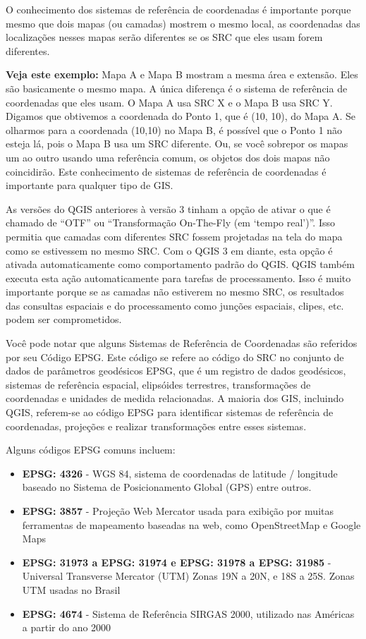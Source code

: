 \documentclass[
]{krantz}
\providecommand{\tightlist}{%
  \setlength{\itemsep}{0pt}\setlength{\parskip}{0pt}}
\begin{document}
O conhecimento dos sistemas de referência de coordenadas é importante porque mesmo que dois mapas (ou camadas) mostrem o mesmo local, as coordenadas das localizações nesses mapas serão diferentes se os SRC que eles usam forem diferentes.

\textbf{Veja este exemplo:} Mapa A e Mapa B mostram a mesma área e extensão. Eles são basicamente o mesmo mapa. A única diferença é o sistema de referência de coordenadas que eles usam. O Mapa A usa SRC X e o Mapa B usa SRC Y. Digamos que obtivemos a coordenada do Ponto 1, que é (10, 10), do Mapa A. Se olharmos para a coordenada (10,10) no Mapa B, é possível que o Ponto 1 não esteja lá, pois o Mapa B usa um SRC diferente. Ou, se você sobrepor os mapas um ao outro usando uma referência comum, os objetos dos dois mapas não coincidirão. Este conhecimento de sistemas de referência de coordenadas é importante para qualquer tipo de GIS.

As versões do QGIS anteriores à versão 3 tinham a opção de ativar o que é chamado de ``OTF'' ou ``Transformação On-The-Fly (em `tempo real')''. Isso permitia que camadas com diferentes SRC fossem projetadas na tela do mapa como se estivessem no mesmo SRC. Com o QGIS 3 em diante, esta opção é ativada automaticamente como comportamento padrão do QGIS. QGIS também executa esta ação automaticamente para tarefas de processamento. Isso é muito importante porque se as camadas não estiverem no mesmo SRC, os resultados das consultas espaciais e do processamento como junções espaciais, clipes, etc. podem ser comprometidos.

Você pode notar que alguns Sistemas de Referência de Coordenadas são referidos por seu Código EPSG. Este código se refere ao código do SRC no conjunto de dados de parâmetros geodésicos EPSG, que é um registro de dados geodésicos, sistemas de referência espacial, elipsóides terrestres, transformações de coordenadas e unidades de medida relacionadas. A maioria dos GIS, incluindo QGIS, referem-se ao código EPSG para identificar sistemas de referência de coordenadas, projeções e realizar transformações entre esses sistemas.

Alguns códigos EPSG comuns incluem:

\begin{itemize}
\tightlist
\item
  \textbf{EPSG: 4326} - WGS 84, sistema de coordenadas de latitude / longitude baseado no Sistema de Posicionamento Global (GPS) entre outros.
\item
  \textbf{EPSG: 3857} - Projeção Web Mercator usada para exibição por muitas ferramentas de mapeamento baseadas na web, como OpenStreetMap e Google Maps
\item
  \textbf{EPSG: 31973 a EPSG: 31974 e EPSG: 31978 a EPSG: 31985} - Universal Transverse Mercator (UTM) Zonas 19N a 20N, e 18S a 25S. Zonas UTM usadas no Brasil
\item
  \textbf{EPSG: 4674} - Sistema de Referência SIRGAS 2000, utilizado nas Américas a partir do ano 2000
\end{itemize}
\end{document}
